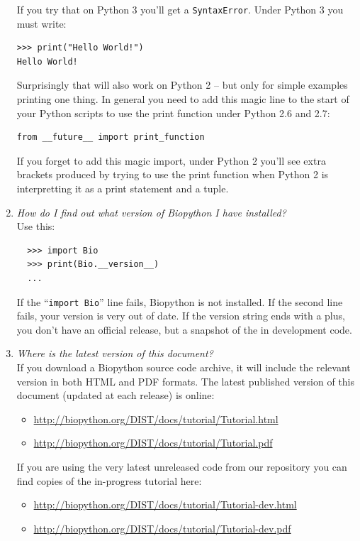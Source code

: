 \documentclass{report}
\begin{document}
\begin{enumerate}
  If you try that on Python 3 you'll get a \verb|SyntaxError|.
  Under Python 3 you must write:

\begin{verbatim}
>>> print("Hello World!")
Hello World!
\end{verbatim}

  Surprisingly that will also work on Python 2 -- but only for simple
  examples printing one thing. In general you need to add this magic
  line to the start of your Python scripts to use the print function
  under Python 2.6 and 2.7:

\begin{verbatim}
from __future__ import print_function
\end{verbatim}

  If you forget to add this magic import, under Python 2 you'll see
  extra brackets produced by trying to use the print function when
  Python 2 is interpretting it as a print statement and a tuple.

  \item \emph{How do I find out what version of Biopython I have installed?} \\
  Use this:
  \begin{verbatim}
  >>> import Bio
  >>> print(Bio.__version__)
  ...
  \end{verbatim}
  If the ``\verb|import Bio|'' line fails, Biopython is not installed.
  If the second line fails, your version is very out of date.
  If the version string ends with a plus, you don't have an official
  release, but a snapshot of the in development code. 

  \item \emph{Where is the latest version of this document?}\\
  If you download a Biopython source code archive, it will include the
  relevant version in both HTML and PDF formats.  The latest published
  version of this document (updated at each release) is online:
  \begin{itemize}
  \item \url{http://biopython.org/DIST/docs/tutorial/Tutorial.html}
  \item \url{http://biopython.org/DIST/docs/tutorial/Tutorial.pdf}
  \end{itemize}
  If you are using the very latest unreleased code from our repository
  you can find copies of the in-progress tutorial here:
  \begin{itemize}
  \item \url{http://biopython.org/DIST/docs/tutorial/Tutorial-dev.html}
  \item \url{http://biopython.org/DIST/docs/tutorial/Tutorial-dev.pdf}
  \end{itemize}
  

\end{enumerate}
\end{document}
